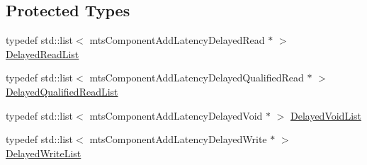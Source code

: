 \subsection*{Protected Types}
\begin{DoxyCompactItemize}
\item 
typedef std\+::list$<$ mts\+Component\+Add\+Latency\+Delayed\+Read $\ast$ $>$ \hyperlink{classmts_component_add_latency_a527c29b91f407598cb31a8113d453610}{Delayed\+Read\+List}
\item 
typedef std\+::list$<$ mts\+Component\+Add\+Latency\+Delayed\+Qualified\+Read $\ast$ $>$ \hyperlink{classmts_component_add_latency_a00e005acc3d0af37d43abee413e92d1e}{Delayed\+Qualified\+Read\+List}
\item 
typedef std\+::list$<$ mts\+Component\+Add\+Latency\+Delayed\+Void $\ast$ $>$ \hyperlink{classmts_component_add_latency_a693394372f8f73601e8f46ab5a5a1780}{Delayed\+Void\+List}
\item 
typedef std\+::list$<$ mts\+Component\+Add\+Latency\+Delayed\+Write $\ast$ $>$ \hyperlink{classmts_component_add_latency_a050cbf3819eb668c8098a78257e22236}{Delayed\+Write\+List}
\end{DoxyCompactItemize}
